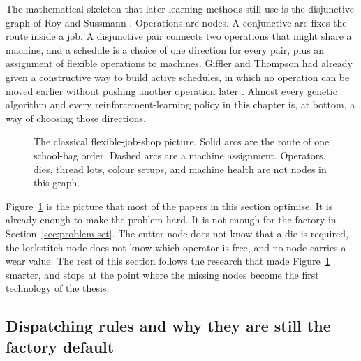 The mathematical skeleton that later learning methods still use is the disjunctive graph of Roy and Sussmann \cite{roy1964}. Operations are nodes. A conjunctive arc fixes the route inside a job. A disjunctive pair connects two operations that might share a machine, and a schedule is a choice of one direction for every pair, plus an assignment of flexible operations to machines. Giffler and Thompson had already given a constructive way to build active schedules, in which no operation can be moved earlier without pushing another operation later \cite{giffler1960}. Almost every genetic algorithm and every reinforcement-learning policy in this chapter is, at bottom, a way of choosing those directions.

\begin{figure}[ht]
\centering
{}
\caption{The classical flexible-job-shop picture. Solid arcs are the route of one school-bag order. Dashed arcs are a machine assignment. Operators, dies, thread lots, colour setups, and machine health are not nodes in this graph.}
\label{fig:classical-graph}
\end{figure}

Figure~\ref{fig:classical-graph} is the picture that most of the papers in this section optimise. It is already enough to make the problem hard. It is not enough for the factory in Section~\ref{sec:problem-set}. The cutter node does not know that a die is required, the lockstitch node does not know which operator is free, and no node carries a wear value. The rest of this section follows the research that made Figure~\ref{fig:classical-graph} smarter, and stops at the point where the missing nodes become the first technology of the thesis.

\subsection{Dispatching rules and why they are still the factory default}

